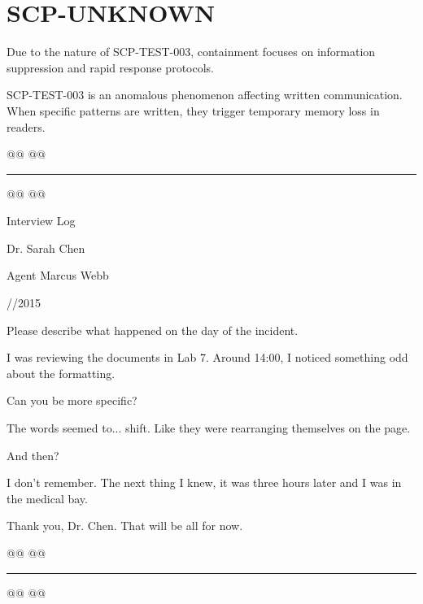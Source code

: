 \section{SCP-UNKNOWN}


\containment

Due to the nature of SCP-TEST-003, containment focuses on information suppression and rapid response protocols.

\scpdescription

SCP-TEST-003 is an anomalous phenomenon affecting written communication. When specific patterns are written, they trigger temporary memory loss in readers.

@@ @@

\hrule\vspace{0.5cm}

@@ @@


Interview Log

\begin{scpdialogue}

 Dr. Sarah Chen

 Agent Marcus Webb

 //2015

 Please describe what happened on the day of the incident.

 I was reviewing the documents in Lab 7. Around 14:00, I noticed something odd about the formatting.

 Can you be more specific?

 The words seemed to... shift. Like they were rearranging themselves on the page.

 And then?

 I don't remember. The next thing I knew, it was three hours later and I was in the medical bay.

 Thank you, Dr. Chen. That will be all for now.

\end{scpdialogue}



@@ @@

\hrule\vspace{0.5cm}

@@ @@

